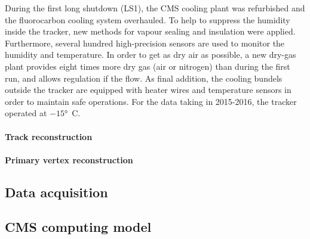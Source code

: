    During the first long shutdown (LS1), the CMS cooling plant was refurbished\cite{running:1998606} and the fluorocarbon cooling system overhauled. To help to suppress the humidity inside the tracker, new methods for vapour sealing and insulation were applied. Furthermore, several hundred high-precision sensors are used to monitor the humidity and temperature. In order to get as dry air as possible, a new dry-gas plant provides eight times more dry gas (air or nitrogen) than during the first run, and allows regulation if the flow. As final addition, the cooling bundels outside the tracker are equipped with heater wires and temperature sensors in order to maintain safe operations. For the data taking in 2015-2016, the tracker operated at $-15$\si{ \degree C}.

\paragraph{Track reconstruction}
\paragraph{Primary vertex reconstruction}
\subsection{Data acquisition}
\subsection{CMS computing model}
